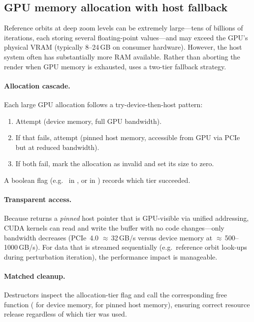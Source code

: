 \subsection{GPU memory allocation with host fallback}
\label{subsec:gpu-mem-fallback}

Reference orbits at deep zoom levels can be extremely large---tens of
billions of iterations, each storing several floating-point
values---and may exceed the GPU's physical VRAM (typically 8--24\,GB
on consumer hardware).  However, the host system often has
substantially more RAM available.  Rather than aborting the render
when GPU memory is exhausted, \FractalShark{} uses a two-tier
fallback strategy.

\paragraph{Allocation cascade.}
Each large GPU allocation follows a try-device-then-host pattern:
\begin{enumerate}
\item Attempt  (device memory, full GPU bandwidth).
\item If that fails, attempt 
      (pinned host memory, accessible from GPU via PCIe but at
      reduced bandwidth).
\item If both fail, mark the allocation as invalid and set
      its size to zero.
\end{enumerate}
A boolean flag (e.g.\  in
, or  in
) records which tier succeeded.

\paragraph{Transparent access.}
Because  returns a \emph{pinned} host pointer
that is GPU-visible via unified addressing, CUDA kernels can read
and write the buffer with no code changes---only bandwidth
decreases (PCIe~4.0 $\approx$\,32\,GB/s versus device memory at
$\approx$\,500--1000\,GB/s).  For data that is streamed
sequentially (e.g.\ reference orbit look-ups during perturbation
iteration), the performance impact is manageable.

\paragraph{Matched cleanup.}
Destructors inspect the allocation-tier flag and call the
corresponding free function ( for device memory,
 for pinned host memory), ensuring correct
resource release regardless of which tier was used.

